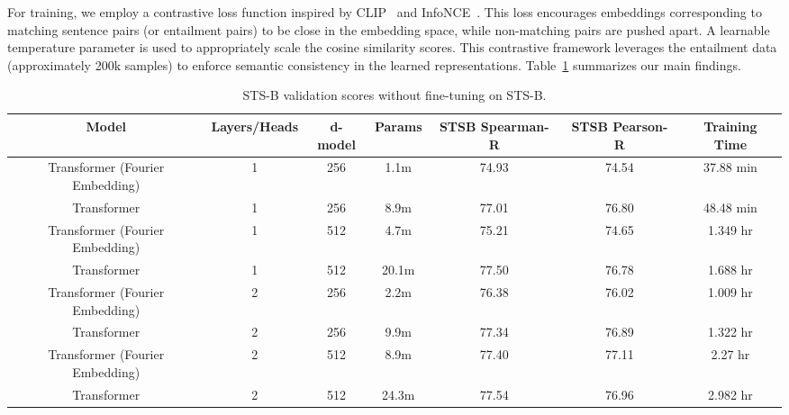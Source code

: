 \documentclass{article}
\begin{document}
For training, we employ a contrastive loss function inspired by CLIP~\cite{radford2021learning} and InfoNCE~\cite{oord2018representation}. This loss encourages embeddings corresponding to matching sentence pairs (or entailment pairs) to be close in the embedding space, while non-matching pairs are pushed apart. A learnable temperature parameter is used to appropriately scale the cosine similarity scores. This contrastive framework leverages the entailment data (approximately 200k samples) to enforce semantic consistency in the learned representations.
Table~\ref{tab:model_scores} summarizes our main findings.
\begin{table}[h!]
    \centering
    \begin{adjustbox}{max width=\textwidth}
    \begin{tabular}{|c|c|c|c|c|c|c|}
        \hline
        \textbf{Model} & \textbf{Layers/Heads} & \textbf{d-model} & \textbf{Params} & \textbf{STSB Spearman-R} & \textbf{STSB Pearson-R} & \textbf{Training Time}\\
        \hline
        Transformer (Fourier Embedding) & 1 & 256 & 1.1m & 74.93 & 74.54 & 37.88 min\\
        Transformer & 1 & 256 & 8.9m & 77.01 & 76.80 & 48.48 min\\
        \hline
        Transformer (Fourier Embedding) & 1 & 512 & 4.7m & 75.21 & 74.65 & 1.349 hr\\
        Transformer & 1 & 512 & 20.1m & 77.50 & 76.78 & 1.688 hr\\
        \hline
        Transformer (Fourier Embedding) & 2 & 256 & 2.2m & 76.38 & 76.02 & 1.009 hr\\
        Transformer & 2 & 256 & 9.9m & 77.34 & 76.89 & 1.322 hr\\
        \hline
        Transformer (Fourier Embedding) & 2 & 512 & 8.9m & 77.40 & 77.11 & 2.27 hr\\
        Transformer & 2 & 512 & 24.3m & 77.54 & 76.96 & 2.982 hr\\
        \hline
    \end{tabular}
    \end{adjustbox}
    \caption{STS-B validation scores without fine-tuning on STS-B.}
    \label{tab:model_scores}
\end{table}
\end{document}
